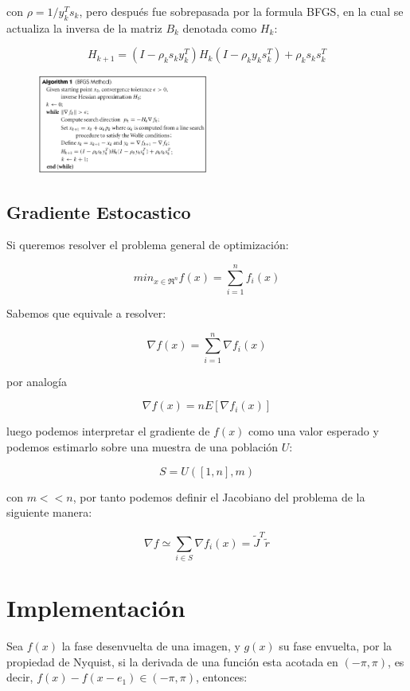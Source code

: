 \documentclass[10pt,journal,compsoc]{styles/IEEEtran}
\begin{document}
con $\rho= 1/y_k^T s_k$, pero después fue sobrepasada por la formula BFGS, en la cual se actualiza la inversa de la matriz $B_k$ denotada como $H_k$:

$$H_{k+1}=(I-\rho_k s_k y_k^T)H_k(I-\rho_k y_k s_k^T)+\rho_k s_k s_k^T$$

\begin{figure}[H]
\centering
\includegraphics[width=0.5\textwidth]{BFGS.png}
\caption*{}
\end{figure}

\subsection{Gradiente Estocastico}

Si queremos resolver el problema general de optimización:

$$min_{x \in \Re^n} f(x)=\sum_{i=1}^n f_i(x)$$

Sabemos que equivale a resolver:

$$\nabla f(x)=\sum_{i=1}^n \nabla f_i (x)$$

por analogía

$$\nabla f(x)=nE[\nabla f_i (x)]$$

luego podemos interpretar el gradiente de $f(x)$ como una valor esperado y podemos estimarlo sobre una muestra de una población $\textit{U}$:

$$\textit{S}=\textit{U}([1,n],m)$$

con $m<<n$, por tanto podemos definir el Jacobiano del problema de la siguiente manera:

$$\nabla f \simeq \sum_{i \in \textit{S}} \nabla f_i (x) =  \tilde{J}^T \tilde{r}$$


\section{Implementaci\'on}

Sea $f(x)$ la fase desenvuelta de una imagen, y $g(x)$ su fase envuelta, por la propiedad de Nyquist, si la derivada de una función esta acotada en $(-\pi,\pi)$, es decir, $f(x)-f(x-e_1) \in (-\pi,\pi)$, entonces:\\
\end{document}
